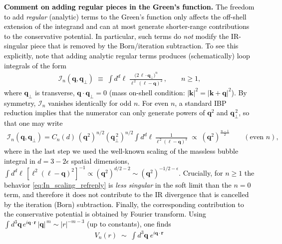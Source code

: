 \textcolor{black}{
\textbf{Comment on adding regular pieces in the Green's function.}  The freedom to add \emph{regular} (analytic) terms to the Green’s function only affects the off-shell extension of the integrand and can at most generate
shorter-range contributions to the conservative potential. In particular, such terms do \emph{not} modify the IR-singular piece that is removed by the Born/iteration subtraction.
To see this explicitly, note that adding analytic regular terms produces (schematically) loop integrals of the form
\begin{align}
\mathcal{I}_n(\boldsymbol{q},\boldsymbol{q}_\perp)
\;\equiv\;
\int d^d\boldsymbol{\ell}\;
\frac{\bigl(2\,\boldsymbol{\ell}\!\cdot\!\boldsymbol{q}_\perp\bigr)^n}{\boldsymbol{\ell}^{\,2}\,(\boldsymbol{\ell}-\boldsymbol{q})^{2}}\,,
\qquad n\ge 1,
\label{eq:In_def_refreply}
\end{align}
where $\boldsymbol{q}_\perp$ is transverse, $\boldsymbol{q}\!\cdot\!\boldsymbol{q}_\perp=0$ (mass on-shell condition: $|\boldsymbol{k}|^2=|\boldsymbol{k}+\boldsymbol{q}|^2$). By symmetry, $\mathcal{I}_n$ vanishes identically for odd $n$.
For even $n$, a standard IBP reduction implies that the numerator can only generate powers of
$\boldsymbol{q}^2$ and $\boldsymbol{q}_\perp^{\,2}$, so that one may write
\begin{align}
\mathcal{I}_n(\boldsymbol{q},\boldsymbol{q}_\perp)
=
C_n(d)\,(\boldsymbol{q}^{2})^{n/2}(\boldsymbol{q}_\perp^{\,2})^{n/2}
\int d^d\boldsymbol{\ell}\,\frac{1}{\boldsymbol{\ell}^{\,2}(\boldsymbol{\ell}-\boldsymbol{q})^{2}}
\;\propto\;
(\boldsymbol{q}^2)^{\frac{n-1}{2}}
\qquad (\text{even } n),
\label{eq:In_scaling_refreply}
\end{align}
where in the last step we used the well-known scaling of the massless bubble integral in $d=3-2\epsilon$ spatial dimensions,
$\int d^d\boldsymbol{\ell}\, [\boldsymbol{\ell}^2(\boldsymbol{\ell}-\boldsymbol{q})^2]^{-1}\propto (\boldsymbol{q}^2)^{d/2-2}\sim (\boldsymbol{q}^2)^{-1/2-\epsilon}$.
Crucially, for $n\ge 1$ the behavior \eqref{eq:In_scaling_refreply} is \emph{less singular} in the soft limit than the $n=0$ term, and therefore it does not contribute to the IR divergence that is cancelled by the iteration (Born) subtraction. Finally, the corresponding contribution to the conservative potential is obtained by Fourier transform.
Using $\int d^3\boldsymbol{q}\,e^{i\boldsymbol{q}\cdot\boldsymbol{r}}\,|\boldsymbol{q}|^{\,m}\sim |r|^{-m-3}$ (up to constants), one finds
\begin{align}
V_n(r)\;\sim\;\int d^3\boldsymbol{q}\;e^{i\boldsymbol{q}\cdot\boldsymbol{r}}\,

\end{align}}
